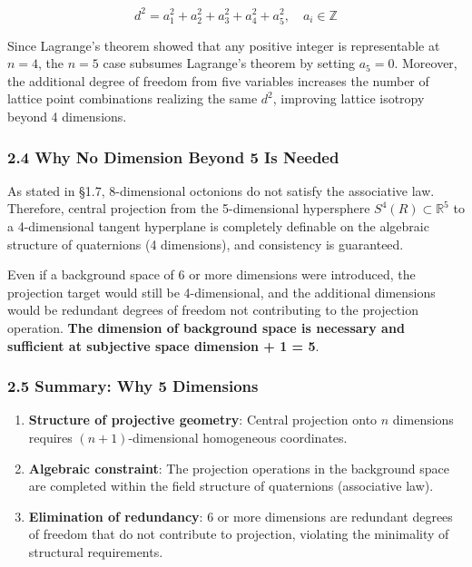 \documentclass[a4paper,11pt]{article}
\providecommand{\tightlist}{\setlength{\itemsep}{0pt}\setlength{\parskip}{0pt}}
\begin{document}
\[d^2 = a_1^2 + a_2^2 + a_3^2 + a_4^2 + a_5^2, \quad a_i \in \mathbb{Z}\]

Since Lagrange's theorem showed that any positive integer is
representable at \(n = 4\), the \(n = 5\) case subsumes Lagrange's
theorem by setting \(a_5 = 0\). Moreover, the additional degree of
freedom from five variables increases the number of lattice point
combinations realizing the same \(d^2\), improving lattice isotropy
beyond 4 dimensions.

\subsubsection{2.4 Why No Dimension Beyond 5 Is
Needed}\label{why-no-dimension-beyond-5-is-needed}

As stated in §1.7, 8-dimensional octonions do not satisfy the
associative law. Therefore, central projection from the 5-dimensional
hypersphere \(S^4(R) \subset \mathbb{R}^5\) to a 4-dimensional tangent
hyperplane is completely definable on the algebraic structure of
quaternions (4 dimensions), and consistency is guaranteed.

Even if a background space of 6 or more dimensions were introduced, the
projection target would still be 4-dimensional, and the additional
dimensions would be redundant degrees of freedom not contributing to the
projection operation. \textbf{The dimension of background space is
necessary and sufficient at subjective space dimension + 1 = 5}.

\subsubsection{2.5 Summary: Why 5
Dimensions}\label{summary-why-5-dimensions}

\begin{enumerate}
\def\labelenumi{\arabic{enumi}.}
\tightlist
\item
  \textbf{Structure of projective geometry}: Central projection onto
  \(n\) dimensions requires \((n+1)\)-dimensional homogeneous
  coordinates.
\item
  \textbf{Algebraic constraint}: The projection operations in the
  background space are completed within the field structure of
  quaternions (associative law).
\item
  \textbf{Elimination of redundancy}: 6 or more dimensions are redundant
  degrees of freedom that do not contribute to projection, violating the
  minimality of structural requirements.
\end{enumerate}
\end{document}
